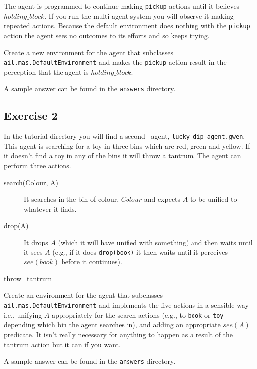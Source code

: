 The agent is programmed to continue making \texttt{pickup} actions  until it believes $holding\_block$.  If you run the multi-agent system you will observe it making repeated actions.  Because the default environment does nothing with the \texttt{pickup} action the agent sees no outcomes to its efforts and so keeps trying.

\begin{sloppypar}
Create a new environment for the agent that subclasses \texttt{ail.mas.DefaultEnvironment} and makes the \texttt{pickup} action result in the perception that the agent is $holding\_block$.
\end{sloppypar}

A sample answer can be found in the \texttt{answers} directory.

\subsection{Exercise 2}
\begin{sloppypar}
In the tutorial directory you will find a second \gwendolen\ agent, \texttt{lucky\_dip\_agent.gwen}.  This agent is searching for a toy in three bins which are red, green and yellow.  If it doesn't find a toy in any of the bins it will throw a tantrum.  The agent can perform three actions.
\end{sloppypar}

\begin{description}
\item[search(Colour, A)] It searches in the bin of colour, $Colour$ and expects $A$ to be unified to whatever it finds. 
\item[drop(A)] It drops $A$ (which it will have unified with something) and then waits until it sees $A$ (e.g., if it does \texttt{drop(book)} it then waits until it perceives $see(book)$ before it continues).
\item[throw\_tantrum]
\end{description}

\begin{sloppypar}
Create an environment for the agent that subclasses \texttt{ail.mas.DefaultEnvironment} and implements the five actions in a sensible way - i.e., unifying $A$ appropriately for the search actions (e.g., to \texttt{book} or \texttt{toy} depending which bin the agent searches in), and adding an appropriate $see(A)$ predicate.  It isn't really necessary for anything to happen as a result of the tantrum action but it can if you want.
\end{sloppypar}

A sample answer can be found in the \texttt{answers} directory.

